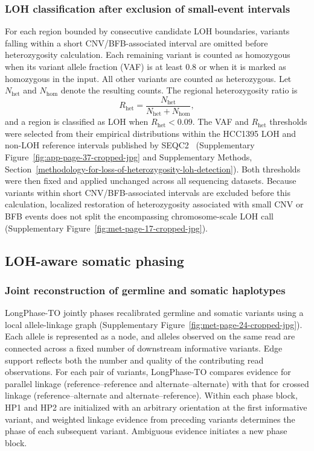 \documentclass[unnumsec,webpdf,contemporary,large]{oup-authoring-template}
\begin{document}
\subsubsection{LOH classification after exclusion of small-event intervals}

For each region bounded by consecutive candidate LOH boundaries, variants falling within a short CNV/BFB-associated interval are omitted before heterozygosity calculation. Each remaining variant is counted as homozygous when its variant allele fraction (VAF) is at least 0.8 or when it is marked as homozygous in the input. All other variants are counted as heterozygous. Let \(N_{\mathrm{het}}\) and \(N_{\mathrm{hom}}\) denote the resulting counts. The regional heterozygosity ratio is
\[
R_{\mathrm{het}}=\frac{N_{\mathrm{het}}}{N_{\mathrm{het}}+N_{\mathrm{hom}}},
\]
and a region is classified as LOH when \(R_{\mathrm{het}}<0.09\). The VAF and \(R_{\mathrm{het}}\) thresholds were selected from their empirical distributions within the HCC1395 LOH and non-LOH reference intervals published by SEQC2~\cite{fang2021} (Supplementary Figure~\ref{fig:app-page-37-cropped-jpg} and Supplementary Methods, Section~\ref{methodology-for-loss-of-heterozygosity-loh-detection}). Both thresholds were then fixed and applied unchanged across all sequencing datasets. Because variants within short CNV/BFB-associated intervals are excluded before this calculation, localized restoration of heterozygosity associated with small CNV or BFB events does not split the encompassing chromosome-scale LOH call (Supplementary Figure~\ref{fig:met-page-17-cropped-jpg}).

\subsection{LOH-aware somatic phasing}\label{haplotype-phasing}

\subsubsection{Joint reconstruction of germline and somatic haplotypes}

LongPhase-TO jointly phases recalibrated germline and somatic variants using a local allele-linkage graph (Supplementary Figure~\ref{fig:met-page-24-cropped-jpg}). Each allele is represented as a node, and alleles observed on the same read are connected across a fixed number of downstream informative variants. Edge support reflects both the number and quality of the contributing read observations. For each pair of variants, LongPhase-TO compares evidence for parallel linkage (reference--reference and alternate--alternate) with that for crossed linkage (reference--alternate and alternate--reference). Within each phase block, HP1 and HP2 are initialized with an arbitrary orientation at the first informative variant, and weighted linkage evidence from preceding variants determines the phase of each subsequent variant. Ambiguous evidence initiates a new phase block.
\end{document}

